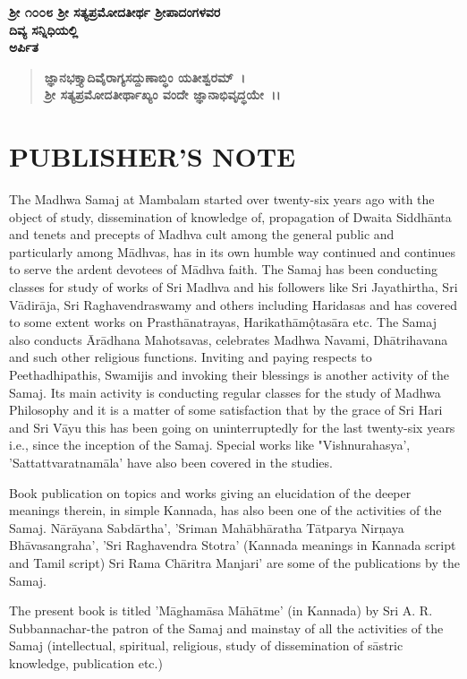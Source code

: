 \begin{center}
\textbf{ಶ‍್ರೀ ೧೦೦೮ ಶ‍್ರೀ ಸತ್ಯಪ್ರಮೋದತೀರ್ಥ ಶ‍್ರೀಪಾದಂಗಳವರ} \\\textbf{ದಿವ್ಯ ಸನ್ನಿಧಿಯಲ್ಲಿ} \\\textbf{ಅರ್ಪಿತ} 
\end{center}

\begin{verse}
\textbf{ಜ್ಞಾನಭಕ್ತ್ಯಾದಿವೈರಾಗ್ಯಸದ್ದುಣಾಬ್ಧಿಂ ಯತೀಶ್ವರಮ್~।}\\\textbf{ಶ‍್ರೀ ಸತ್ಯಪ್ರಮೋದತೀರ್ಥಾಖ್ಯಂ ವಂದೇ ಜ್ಞಾನಾಭಿವೃದ್ಧಯೇ~।।}
\end{verse}

\chapter*{PUBLISHER'S NOTE}

The Madhwa Samaj at Mambalam started over twenty-six years ago with the object of study, dissemination of knowledge of, propagation of Dwaita Siddhānta and tenets and precepts of Madhva cult among the general public and particularly among Mādhvas, has in its own humble way continued and continues to serve the ardent devotees of Mādhva faith. The Samaj has been conducting classes for study of works of Sri Madhva and his followers like Sri Jayathirtha, Sri Vādirāja, Sri Raghavendraswamy and others including Haridasas and has covered to some extent works on Prasthānatrayas, Harikathāmộtasāra etc. The Samaj also conducts Ārādhana Mahotsavas, celebrates Madhwa Navami, Dhātrihavana and such other religious functions. Inviting and paying respects to Peethadhipathis, Swamijis and invoking their blessings is another activity of the Samaj. Its main activity is conducting regular classes for the study of Madhwa Philosophy and it is a matter of some satisfaction that by the grace of Sri Hari and Sri Vāyu this has been going on uninterruptedly for the last twenty-six years i.e., since the inception of the Samaj. Special works like "Vishnurahasya', 'Sattattvaratnamāla' have also been covered in the studies.

Book publication on topics and works giving an elucidation of the deeper meanings therein, in simple Kannada, has also been one of the activities of the Samaj. Nārāyana Sabdārtha', 'Sriman Mahābhāratha Tātparya Nirņaya Bhāvasangraha', 'Sri Raghavendra Stotra' (Kannada meanings in Kannada script and Tamil script) Sri Rama Chāritra Manjari' are some of the publications by the Samaj.

The present book is titled 'Māghamāsa Māhātme' (in Kannada) by Sri A. R. Subbannachar-the patron of the Samaj and mainstay of all the activities of the Samaj (intellectual, spiritual, religious, study of dissemination of sāstric knowledge, publication etc.)

